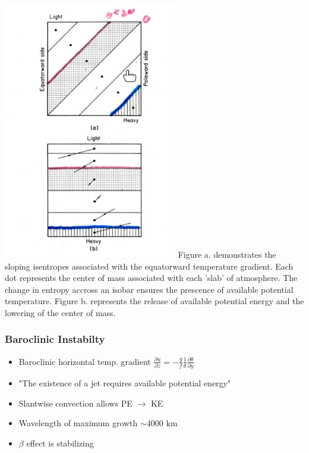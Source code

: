 \documentclass[a4paper,12pt]{article}
\begin{document}
\includegraphics[width=\textwidth]{1}
Figure a. demonstrates the sloping isentropes associated with the equatorward temperature gradient. Each dot represents the center of mass associated with each 'slab' of atmosphere. The change in entropy accross an isobar ensures the prescence of available potential temperature.  Figure b. represents the release of available potential energy and the lowering of the center of mass.

\subsubsection*{Baroclinic Instabilty}

\begin{itemize}
	\item Baroclinic horizontal temp. gradient $\frac{\partial u}{\partial z} = -\frac{g}{f}\frac{1}{\theta}\frac{\partial \theta}{\partial y}$
	\item "The existence of a jet requires available potential energy"
	\item Slantwise convection allows PE $\rightarrow$ KE
	\item Wavelength of maximum growth $\sim 4000 \text{ km}$
	\item $\beta$ effect is stabilizing
\end{itemize}
\end{document}
